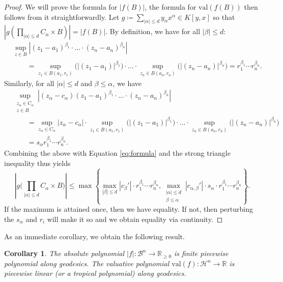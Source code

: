 \documentclass[10pt]{article}
\newtheorem{corollary}[theorem]{Corollary}
\theoremstyle{definition}
\newcommand{\RR}{\mathbb{R}}
\newcommand{\val}{{\mathrm{val}}}
\begin{document}
\begin{proof}
  We will prove the formula for $|f(B)|$, the formula for $\val(f(B))$ then follows from it straightforwardly.
  Let $g\coloneqq \sum_{|\alpha|\leq d} y_\alpha x^\alpha\in K[y,x]$ so that $|g(\prod_{|\alpha|\leq d}C_\alpha\times B)|=|f(B)|$.  By definition, we have for all $|\beta|\leq d$:
  \begin{align*}
    &\sup_{z\in B}|(z_1-a_1)^{\beta_1}\cdot\ldots\cdot (z_n-a_n)^{\beta_n}|\\
    &\qquad = \sup_{z_1\in B(a_1,r_1)}\Big(|(z_1-a_1)|^{\beta_1}\Big) \cdot\ldots\cdot \sup_{z_n\in B(a_n,r_n)}\Big(|(z_n-a_n)|^{\beta_n}\Big)
    = r_1^{\beta_1}\cdots r_n^{\beta_n}.
  \end{align*}
  Similarly, for all $|\alpha|\leq d$ and $\beta\leq\alpha$, we have
  \begin{align*}
    &\sup_{\substack{z_\alpha\in C_\alpha\\ z\in B}} |(z_\alpha-c_\alpha)(z_1-a_1)^{\beta_1}\cdot\ldots\cdot (z_n-a_n)^{\beta_n}|\\
    &\qquad = \sup_{z_\alpha\in C_\alpha} |z_\alpha-c_\alpha| \cdot \sup_{z_1\in B(a_1,r_1)}\Big(|(z_1-a_1)|^{\beta_1}\Big) \cdot\ldots\cdot \sup_{z_n\in B(a_n,r_n)}\Big(|(z_n-a_n)|^{\beta_n}\Big)\\
    &\qquad = s_\alpha r_1^{\beta_1}\cdots r_n^{\beta_n}.
  \end{align*}
  Combining the above with Equation \eqref{eq:formula} and the strong triangle inequality thus yields
  \begin{equation*}
    \left|g\Big(\prod_{|\alpha|\leq d}C_\alpha\times B\Big)\right|\leq
    \max\left\{
      \max_{|\beta|\leq d}|c_\beta'|\cdot r_1^{\beta_1}\cdots r_n^{\beta_n},
      \max_{\substack{|\alpha|\leq d\\ \beta \le \alpha}} |c_{\alpha,\beta}'|\cdot s_\alpha\cdot r_1^{\beta_1}\cdots r_n^{\beta_n}
    \right\}.
  \end{equation*}
  If the maximum is attained once, then we have equality.  If not, then perturbing the $s_\alpha$ and $r_i$ will make it so and we obtain equality via continuity.
\end{proof}

As an immediate corollary, we obtain the following result.

\begin{corollary}\label{cor:absolutePolynomialPiecewisePolynomial}
  The absolute polynomial $|f|\colon \mathcal B^n\rightarrow\RR_{\geq 0}$ is finite piecewise polynomial along geodesics.  The valuative polynomial $\val(f)\colon\mathcal H^n\rightarrow\RR$ is piecewise linear (or a tropical polynomial) along geodesics.
\end{corollary}
\end{document}

